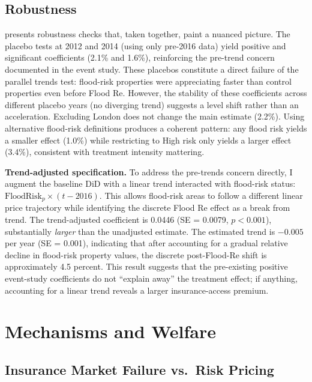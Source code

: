 \documentclass[12pt]{article}
\begin{document}
\subsection{Robustness}



 presents robustness checks that, taken together, paint a nuanced picture. The placebo tests at 2012 and 2014 (using only pre-2016 data) yield positive and significant coefficients (2.1\% and 1.6\%), reinforcing the pre-trend concern documented in the event study. These placebos constitute a direct failure of the parallel trends test: flood-risk properties were appreciating faster than control properties even before Flood Re. However, the stability of these coefficients across different placebo years (no diverging trend) suggests a level shift rather than an acceleration. Excluding London does not change the main estimate (2.2\%). Using alternative flood-risk definitions produces a coherent pattern: any flood risk yields a smaller effect (1.0\%) while restricting to High risk only yields a larger effect (3.4\%), consistent with treatment intensity mattering.

\textbf{Trend-adjusted specification.} To address the pre-trends concern directly, I augment the baseline DiD with a linear trend interacted with flood-risk status: $\text{FloodRisk}_p \times (t - 2016)$. This allows flood-risk areas to follow a different linear price trajectory while identifying the discrete Flood Re effect as a break from trend. The trend-adjusted coefficient is 0.0446 (SE = 0.0079, $p < 0.001$), substantially \textit{larger} than the unadjusted estimate. The estimated trend is $-0.005$ per year (SE = 0.001), indicating that after accounting for a gradual relative decline in flood-risk property values, the discrete post-Flood-Re shift is approximately 4.5 percent. This result suggests that the pre-existing positive event-study coefficients do not ``explain away'' the treatment effect; if anything, accounting for a linear trend reveals a larger insurance-access premium.


\section{Mechanisms and Welfare} \label{sec:mechanisms}

\subsection{Insurance Market Failure vs.\ Risk Pricing}
\end{document}
